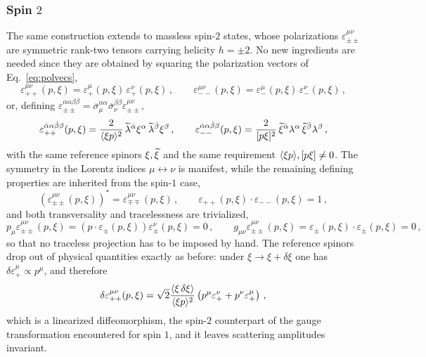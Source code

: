 \subsubsection{Spin $2$}
The same construction extends to massless spin-$2$ states, whose polarizations
$\varepsilon^{\mu\nu}_{\pm\pm}$ are symmetric rank-two tensors carrying helicity $h=\pm 2$.
No new ingredients are needed since they are obtained by squaring the polarization vectors of
Eq.~\eqref{eq:polvecs},
\begin{equation}\label{eq:polgrav}
    \varepsilon^{\mu\nu}_{++}(p,\xi) = \varepsilon^{\mu}_{+}(p,\xi)\,\varepsilon^{\nu}_{+}(p,\xi)\,,
    \qquad
    \varepsilon^{\mu\nu}_{--}(p,\xi) = \varepsilon^{\mu}_{-}(p,\xi)\,\varepsilon^{\nu}_{-}(p,\xi)\,,
\end{equation}
or, defining $\varepsilon_{\pm\pm}^{\dot\alpha\alpha\dot\beta\beta} = \overline \sigma_\mu^{\dot\alpha\alpha}\overline\sigma_\nu^{\dot\beta\beta}\varepsilon_{\pm\pm}^{\mu\nu}$,
\begin{equation}
    \varepsilon_{++}^{\dot\alpha\alpha\dot\beta\beta}(p,\xi)
    = \frac{2}{\langle \xi p \rangle^2}\,\widetilde{\lambda}^{\dot\alpha}\xi^\alpha\,\widetilde{\lambda}^{\dot\beta}\xi^\beta\,,
    \qquad
    \varepsilon_{--}^{\dot\alpha\alpha\dot\beta\beta}(p,\xi)
    = \frac{2}{\lbrack p \xi \rbrack^2}\,\widetilde{\xi}^{\dot\alpha}\lambda^\alpha\,\widetilde{\xi}^{\dot\beta}\lambda^\beta\,,
\end{equation}
with the same reference spinors $\xi,\widetilde{\xi}$ and the same requirement
$\langle \xi p \rangle,\lbrack p \xi \rbrack\neq 0$.
The symmetry in the Lorentz indices $\mu\leftrightarrow\nu$ is manifest, while the remaining defining properties are
inherited from the spin-$1$ case,
\begin{equation}
    (\varepsilon^{\mu\nu}_{\pm\pm}(p,\xi))^* = \varepsilon^{\mu\nu}_{\mp\mp}(p,\xi)\,,
    \qquad
    \varepsilon_{++}(p,\xi) \cdot \varepsilon_{--}(p,\xi) = 1\,,
\end{equation}
and both transversality and tracelessness are trivialized,
\begin{equation}
    p_\mu\varepsilon^{\mu\nu}_{\pm\pm}(p,\xi) = (p\cdot\varepsilon_\pm(p,\xi))\varepsilon^\nu_\pm(p,\xi) = 0\,,
    \qquad
    g_{\mu\nu}\varepsilon^{\mu\nu}_{\pm\pm}(p,\xi) = \varepsilon_\pm(p,\xi)\cdot\varepsilon_\pm(p,\xi) = 0\,,
\end{equation}
so that no traceless projection has to be imposed by hand.
The reference spinors drop out of physical quantities exactly as before: under
$\xi \to \xi + \delta\xi$ one has $\delta\varepsilon^\mu_+ \propto p^\mu$, and therefore
\begin{equation}
   \delta\varepsilon^{\mu\nu}_{++}(p,\xi) = \sqrt{2}\frac{\langle \xi\, \delta\xi \rangle}{\langle \xi p \rangle^2}\left(p^\mu \varepsilon_+^\nu + p^\nu \varepsilon_+^\mu \right)\,,
\end{equation}
which is a linearized diffeomorphism, the spin-$2$ counterpart of the gauge transformation
encountered for spin $1$, and it leaves scattering amplitudes invariant.


